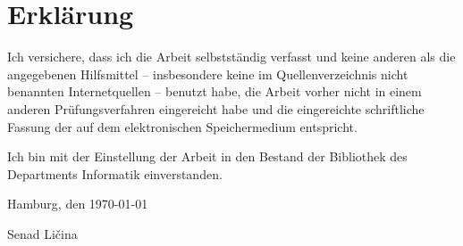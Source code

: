 \documentclass[12pt,a4paper,pointednumbers,abstracton]{scrartcl}
\begin{document}
\newpage
{}
\section*{Erklärung}
Ich versichere, dass ich die Arbeit selbstständig verfasst und keine anderen als die angegebenen Hilfsmittel -- insbesondere keine im Quellenverzeichnis nicht benannten Internetquellen -- benutzt habe, die Arbeit vorher nicht in einem anderen Prüfungsverfahren eingereicht habe und die eingereichte schriftliche Fassung der auf dem elektronischen Speichermedium entspricht.

Ich bin mit der Einstellung der Arbeit in den Bestand der Bibliothek des Departments Informatik einverstanden.

Hamburg, den \today

\bigskip
Senad Ličina
\end{document}
